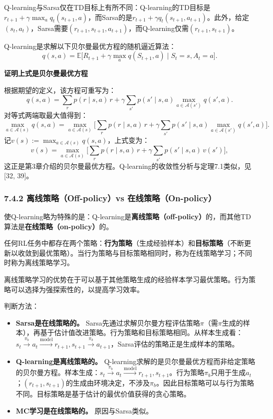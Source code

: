 \documentclass[UTF8]{article}
\begin{document}
Q-learning与Sarsa仅在TD目标上有所不同：Q-learning的TD目标是$r_{t+1} + \gamma \max_a q_t(s_{t+1}, a)$，而Sarsa的是$r_{t+1} + \gamma q_t(s_{t+1}, a_{t+1})$。此外，给定$(s_t, a_t)$，Sarsa需要$(r_{t+1}, s_{t+1}, a_{t+1})$，而Q-learning仅需$(r_{t+1}, s_{t+1})$。

Q-learning是求解以下贝尔曼最优方程的随机逼近算法：
\[
q(s, a) = \mathbb{E}\Big[R_{t+1} + \gamma \max_{a} q(S_{t+1}, a) \;\Big|\; S_t = s, A_t = a\Big].
\]

\begin{proofbox}
\textbf{证明上式是贝尔曼最优方程}

根据期望的定义，该方程可重写为：
\[
q(s, a) = \sum_r p(r \mid s, a)\,r + \gamma \sum_{s'} p(s' \mid s, a) \max_{a \in \mathcal{A}(s')} q(s', a).
\]
对等式两端取最大值得到：
\[
\max_{a \in \mathcal{A}(s)} q(s, a) = \max_{a \in \mathcal{A}(s)}\Big[\sum_r p(r \mid s, a)\,r + \gamma \sum_{s'} p(s' \mid s, a) \max_{a \in \mathcal{A}(s')} q(s', a)\Big].
\]
记$v(s) := \max_{a \in \mathcal{A}(s)} q(s, a)$，上式变为：
\[
v(s) = \max_{a \in \mathcal{A}(s)}\Big[\sum_r p(r \mid s, a)\,r + \gamma \sum_{s'} p(s' \mid s, a)\,v(s')\Big],
\]
这正是第3章介绍的贝尔曼最优方程。Q-learning的收敛性分析与定理7.1类似，见[32, 39]。
\end{proofbox}

\subsubsection*{7.4.2 离线策略（Off-policy）vs 在线策略（On-policy）}

使Q-learning略为特殊的是：Q-learning是\textbf{离线策略（off-policy）}的，而其他TD算法是\textbf{在线策略（on-policy）}的。

任何RL任务中都存在两个策略：\textbf{行为策略}（生成经验样本）和\textbf{目标策略}（不断更新以收敛到最优策略）。当行为策略与目标策略相同时，称为在线策略学习；不同时称为离线策略学习。

离线策略学习的优势在于可以基于其他策略生成的经验样本学习最优策略。行为策略可以选择为强探索性的，以提高学习效率。

判断方法：
\begin{itemize}
    \item \textbf{Sarsa是在线策略的。} Sarsa先通过求解贝尔曼方程评估策略$\pi$（需$\pi$生成的样本），再基于估计值改进策略。行为策略和目标策略相同。从样本生成看：$s_t \xrightarrow{\pi_b} a_t \xrightarrow{\text{model}} r_{t+1}, s_{t+1} \xrightarrow{\pi_b} a_{t+1}$，Sarsa评估的策略正是生成样本的策略。

    \item \textbf{Q-learning是离线策略的。} Q-learning求解的是贝尔曼最优方程而非给定策略的贝尔曼方程。样本生成：$s_t \xrightarrow{\pi_b} a_t \xrightarrow{\text{model}} r_{t+1}, s_{t+1}$。行为策略$\pi_b$只用于生成$a_t$；$(r_{t+1}, s_{t+1})$的生成由环境决定，不涉及$\pi_b$。因此目标策略可以与行为策略不同。目标策略是基于估计的最优价值获得的贪心策略。

    \item \textbf{MC学习是在线策略的。} 原因与Sarsa类似。
\end{itemize}
\end{document}

